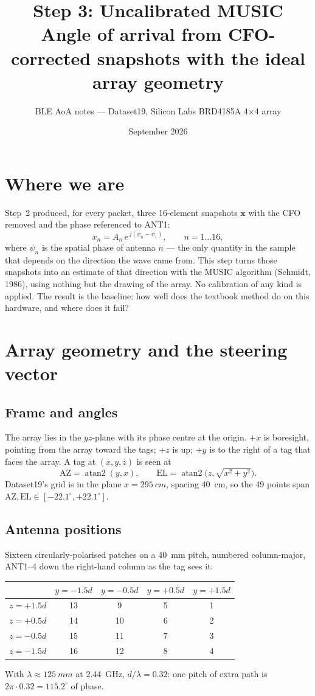 \documentclass[11pt,a4paper]{article}
\title{Step 3: Uncalibrated MUSIC\\[4pt]\large Angle of arrival from CFO-corrected snapshots with the ideal array geometry}
\author{BLE AoA notes --- Dataset19, Silicon Labs BRD4185A 4$\times$4 array}
\date{September 2026}
\newcommand{\vect}[1]{\mathbf{#1}}
\begin{document}
\maketitle

\section{Where we are}
Step~2 produced, for every packet, three 16-element snapshots $\vect x$ with the CFO removed and the phase referenced to ANT1:
\[
  x_n = A_n\, e^{\,j(\psi_n - \psi_1)}, \qquad n = 1\dots 16,
\]
where $\psi_n$ is the spatial phase of antenna $n$ --- the only quantity in the sample that depends on the direction the wave came from. This step turns those snapshots into an estimate of that direction with the MUSIC algorithm (Schmidt, 1986), using nothing but the drawing of the array. No calibration of any kind is applied. The result is the baseline: how well does the textbook method do on this hardware, and where does it fail?

\section{Array geometry and the steering vector}

\subsection{Frame and angles}
The array lies in the $yz$-plane with its phase centre at the origin. $+x$ is boresight, pointing from the array toward the tags; $+z$ is up; $+y$ is to the right of a tag that faces the array. A tag at $(x, y, z)$ is seen at
\[
  \mathrm{AZ} = \operatorname{atan2}(y, x), \qquad
  \mathrm{EL} = \operatorname{atan2}\!\big(z, \sqrt{x^2 + y^2}\big).
\]
Dataset19's grid is in the plane $x = \SI{295}{cm}$, spacing \SI{40}{cm}, so the 49 points span $\mathrm{AZ}, \mathrm{EL} \in [-22.1^\circ, +22.1^\circ]$.

\subsection{Antenna positions}
Sixteen circularly-polarised patches on a \SI{40}{mm} pitch, numbered column-major, ANT1--4 down the right-hand column as the tag sees it:
\begin{center}
\begin{tabular}{c|cccc}
 & $y=-1.5d$ & $y=-0.5d$ & $y=+0.5d$ & $y=+1.5d$ \\ \hline
$z=+1.5d$ & 13 & 9  & 5 & 1 \\
$z=+0.5d$ & 14 & 10 & 6 & 2 \\
$z=-0.5d$ & 15 & 11 & 7 & 3 \\
$z=-1.5d$ & 16 & 12 & 8 & 4 \\
\end{tabular}
\end{center}
With $\lambda \approx \SI{125}{mm}$ at \SI{2.44}{GHz}, $d/\lambda = 0.32$: one pitch of extra path is $2\pi\cdot 0.32 = 115.2^\circ$ of phase.
\end{document}
